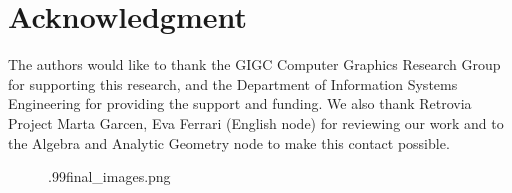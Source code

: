 \documentclass[10pt, conference]{IEEEtran}
\begin{document}
\iffinal
\section*{Acknowledgment}
%
The authors would like to thank the GIGC Computer Graphics Research Group for supporting this research, and the Department of Information Systems 
Engineering for providing the support and funding. We also thank Retrovia Project Marta Garcen, Eva Ferrari (English node) for reviewing our work 
and to the Algebra and Analytic Geometry node to make this contact possible.
\fi














\begin{figure}[!hbp]
	{.99}{final_images.png}
\end{figure}
\end{document}
